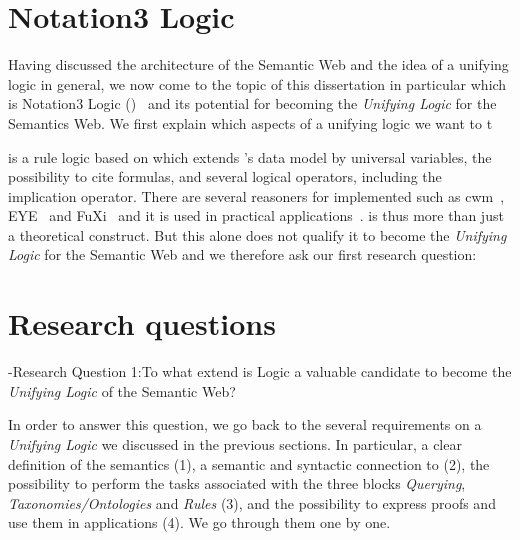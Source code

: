 \section{Notation3 Logic}
Having discussed the architecture of the Semantic Web and the idea of a unifying logic in general, 
we now come to the topic of this dissertation in particular which  is 
Notation3 Logic (\nthreelogic)~\cite{N3Logic} and its potential for becoming the \emph{Unifying Logic} for the Semantics Web. 
We first explain which aspects of a unifying logic we want to t

\nthreelogic is a rule logic based on \rdf which extends \rdf's data model by universal variables, the possibility to cite formulas, and  several logical operators, 
including the implication operator. %
There are several reasoners for \nthreelogic implemented such as cwm~\cite{cwm}, EYE~\cite{eye} and FuXi~\cite{fuxi} and it is used in practical applications~\cite{eyepaper}. 
\nthreelogic is thus more than just a theoretical construct. But this alone does not qualify it to become the \emph{Unifying Logic}
for the Semantic Web and we therefore ask our first research question:

\label{prefixremark}

\section{Research questions}



\hyp{Research Question 1:}{To what extend is \nthree Logic a valuable candidate to become the \emph{Unifying Logic} of the Semantic Web?}

In order to answer this question, we go back to the several requirements on a \emph{Unifying Logic} we discussed in the previous sections. 
In particular,
a clear definition of the semantics (1), a semantic and syntactic connection to \rdf (2), the possibility to perform the tasks associated with 
the three blocks \emph{Querying}, \emph{Taxonomies/Ontologies}
and \emph{Rules} (3), and the possibility to express proofs and use them in applications (4). We go through them one by one.

